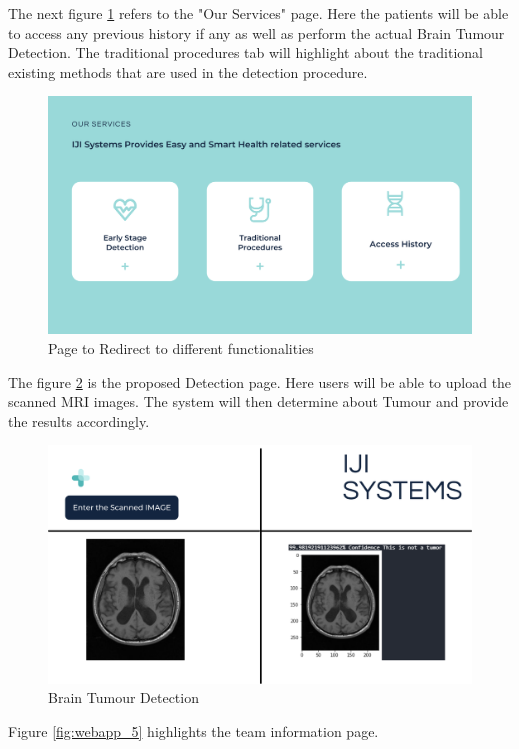 The next figure \ref{fig:webapp_3} refers to the "Our Services" page. Here the patients will be able to access any previous history if any as well as perform the actual Brain Tumour Detection. The traditional procedures tab will highlight about the traditional existing methods that are used in the detection procedure.
\begin{figure}[H]
\includegraphics[scale=0.45]{Photos/webapp_3.png}
\caption{Page to Redirect to different functionalities} \label{fig:webapp_3}
\end{figure}
The figure \ref{fig:webapp_4} is the proposed Detection page. Here users will be able to upload the scanned MRI images. The system will then determine about Tumour and provide the results accordingly.
\begin{figure}[H]
\includegraphics[scale=0.45]{Photos/webapp_4.png}
\caption{Brain Tumour Detection} \label{fig:webapp_4}
\end{figure}
Figure \ref{fig:webapp_5} highlights the team information page.
